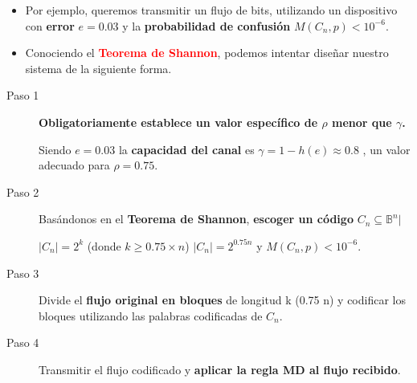 \documentclass{beamer}
\theoremstyle{plain}
\theoremstyle{example}
\theoremstyle{example}
\begin{document}
 

\begin{frame}  \footnotesize  

\begin{itemize}
\item Por ejemplo, queremos transmitir un flujo de bits, utilizando un dispositivo con \textbf{error}  $e = 0.03$ y la \textbf{probabilidad de confusión} $M (C_n, p) < 10^{-6}$. 

\item Conociendo el \textcolor{red}{\textbf{Teorema de Shannon}}, podemos intentar diseñar nuestro sistema de la siguiente forma.

\end{itemize}


\begin{description}
\item[Paso 1] \textbf{Obligatoriamente establece  un valor específico de $\rho$ menor que $\gamma$.}

Siendo $e = 0.03$ la \textbf{capacidad del canal} es $\gamma = 1 - h(e) \approx 0.8$ ,  un valor adecuado para  $\rho = 0.75$.

\item[Paso 2] Basándonos en el \textbf{Teorema de Shannon}, \textbf{escoger un código} $C_n \subseteq \mathbb{B}^n |$ 

\begin{center}
$|C_n| = 2^k$ (donde $k \geq 0.75 \times n$) $|C_n| = 2^{0.75n}$  y	$M(C_n,p) < 10^{-6}$.
\end{center}

\item[Paso 3] Divide el \textbf{flujo original en bloques} de longitud k (0.75 n) y codificar los bloques utilizando las palabras codificadas de $C_n$.

\item[Paso 4] Transmitir el flujo codificado y \textbf{aplicar la regla MD al flujo recibido}.
\end{description}

\end{frame} 
\end{document}
